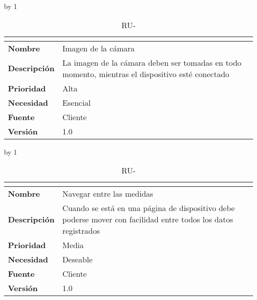 \advance\ru by 1
\begin{table}[H]
	\caption{RU-\number\ru}
	\begin{tabular}{|l|p{}|}
		\hline
		\multicolumn{2}{|c|}{\cellcolor[HTML]{BFBFBF}{\color[HTML]{000000} \textbf{RU-\number\ru}}} \\ \hline
		\textbf{Nombre}      & Imagen de la cámara                                                                              \\ \hline
		\textbf{Descripción} & La imagen de la cámara deben ser tomadas en todo momento, mientras el dispositivo esté conectado \\ \hline
		\textbf{Prioridad}   & Alta                                                                                             \\ \hline
		\textbf{Necesidad}   & Esencial                                                                                         \\ \hline
		\textbf{Fuente}      & Cliente                                                                                          \\ \hline
		\textbf{Versión}     & 1.0                                                                                              \\ \hline
	\end{tabular}
\end{table}
\advance\ru by 1
\begin{table}[H]
	\caption{RU-\number\ru}
	\begin{tabular}{|l|p{}|}
		\hline
		\multicolumn{2}{|c|}{\cellcolor[HTML]{BFBFBF}{\color[HTML]{000000} \textbf{RU-\number\ru}}} \\ \hline
		\textbf{Nombre}      & Navegar entre las medidas                                                                                      \\ \hline
		\textbf{Descripción} & Cuando se está en una página de dispositivo debe poderse mover con facilidad entre todos los datos registrados \\ \hline
		\textbf{Prioridad}   & Media                                                                                                          \\ \hline
		\textbf{Necesidad}   & Deseable                                                                                                       \\ \hline
		\textbf{Fuente}      & Cliente                                                                                                        \\ \hline
		\textbf{Versión}     & 1.0                                                                                                            \\ \hline
	\end{tabular}
\end{table}
